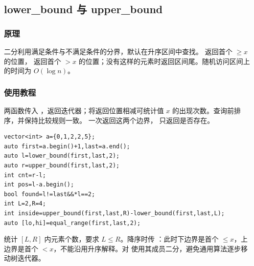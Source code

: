 \subsection{lower\_bound 与 upper\_bound}
\label{stl:binary-search}
\subsubsection*{原理}
二分利用满足条件与不满足条件的分界，默认在升序区间中查找。 返回首个 $\ge x$ 的位置， 返回首个 $>x$ 的位置；没有这样的元素时返回区间尾。随机访问区间上的时间为 $O(\log n)$。
\subsubsection*{使用教程}
两函数传入 ，返回迭代器；将返回位置相减可统计值 $x$ 的出现次数。查询前排序，并保持比较规则一致。 一次返回这两个边界， 只返回是否存在。
\begin{lstlisting}[style=mtycpp,numbers=none]
vector<int> a={0,1,2,2,5};
auto first=a.begin()+1,last=a.end();
auto l=lower_bound(first,last,2);
auto r=upper_bound(first,last,2);
int cnt=r-l;
int pos=l-a.begin();
bool found=l!=last&&*l==2;
int L=2,R=4;
int inside=upper_bound(first,last,R)-lower_bound(first,last,L);
auto [lo,hi]=equal_range(first,last,2);
\end{lstlisting}
 统计 $[L,R]$ 内元素个数，要求 $L\le R$。降序时传 ：此时下边界是首个 $\le x$，上边界是首个 $<x$，不能沿用升序解释。对  使用其成员二分，避免通用算法逐步移动树迭代器。

